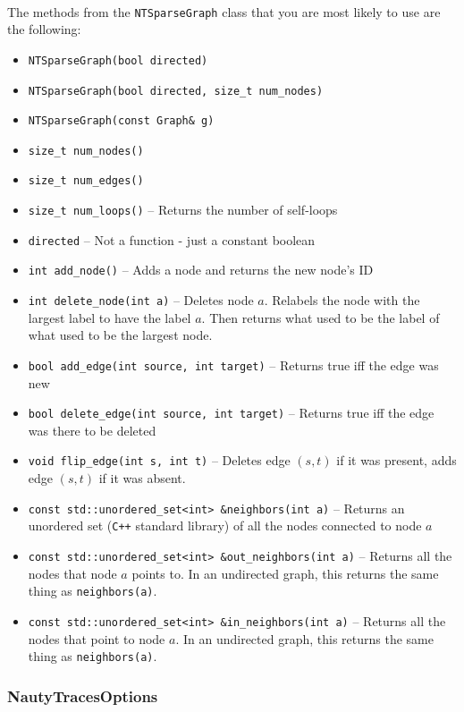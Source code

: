 \documentclass{article}
\begin{document}
\ 

\vspace{-1cm}

The methods from the \verb|NTSparseGraph| class that you are most likely to use are the following:

\begin{itemize}
    \setlength\itemsep{-0.1em}
    \item \verb|NTSparseGraph(bool directed)|
    \item \verb|NTSparseGraph(bool directed, size_t num_nodes)|
    \item \verb|NTSparseGraph(const Graph& g)|
    \item \verb|size_t num_nodes()|
    \item \verb|size_t num_edges()|
    \item \verb|size_t num_loops()| -- Returns the number of self-loops
    \item \verb|directed| -- Not a function - just a constant boolean
    \item \verb|int add_node()| -- Adds a node and returns the new node's ID
    \item \verb|int delete_node(int a)| -- Deletes node $a$. Relabels the node with the largest label to have the label $a$. Then returns what used to be the label of what used to be the largest node.
    \item \verb|bool add_edge(int source, int target)| -- Returns true iff the edge was new
    \item \verb|bool delete_edge(int source, int target)| -- Returns true iff the edge was there to be deleted
    \item \verb|void flip_edge(int s, int t)| -- Deletes edge $(s, t)$ if it was present, adds edge $(s, t)$ if it was absent.
    \item \verb|const std::unordered_set<int> &neighbors(int a)| -- Returns an unordered set (\verb|C++| standard library) of all the nodes connected to node $a$
    \item \verb|const std::unordered_set<int> &out_neighbors(int a)| -- Returns all the nodes that node $a$ points to. In an undirected graph, this returns the same thing as \verb|neighbors(a)|.
    \item \verb|const std::unordered_set<int> &in_neighbors(int a)| -- Returns all the nodes that point to node $a$. In an undirected graph, this returns the same thing as \verb|neighbors(a)|.
\end{itemize}

\subsubsection{NautyTracesOptions}
\end{document}
